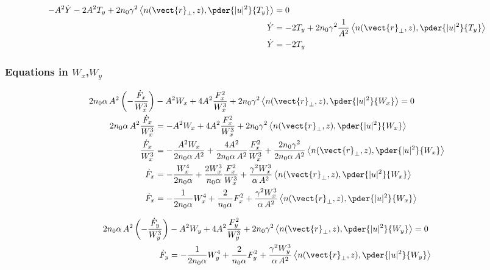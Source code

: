 \begin{equation}
\begin{split}
   -A^2 \dot{Y} - 2A^2 T_y  + 2n_0 \gamma^2 \left<n(\vect{r}_{\perp},z), \pder{|u|^2}{T_{y}}\right> &=0\\
      \dot{Y} &= - 2T_y  + 2n_0 \gamma^2 \frac{1}{A^2} \left<n(\vect{r}_{\perp},z), \pder{|u|^2}{T_{y}}\right>\\
      \dot{Y} &= - 2T_y 
\end{split}
\end{equation}

\subsubsection{Equations in $W_x$,$W_y$}

\begin{equation}
\begin{split}
     2 n_0 \alpha\, A^2 \left(  -\frac{\dot{F}_{x} }{W_{x}^3} \right)  &- A^2 W_x + 4 A^2 \frac{F_{x}^2}{W_{x}^3}  + 2n_0 \gamma^2 \left<n(\vect{r}_{\perp},z), \pder{|u|^2}{W_{x}}\right> = 0 \\
     2 n_0 \alpha\, A^2 \frac{\dot{F}_{x} }{W_{x}^3}  &=   - A^2 W_x + 4 A^2 \frac{F_{x}^2}{W_{x}^3}  + 2n_0 \gamma^2 \left<n(\vect{r}_{\perp},z), \pder{|u|^2}{W_{x}}\right>  \\
     \frac{\dot{F}_{x} }{W_{x}^3}  &=   - \frac{A^2 W_x}{2 n_0 \alpha\, A^2} + \frac{4 A^2 }{2 n_0 \alpha\, A^2} \frac{F_{x}^2}{W_{x}^3}  + \frac{2n_0 \gamma^2}{2 n_0 \alpha\, A^2}  \left<n(\vect{r}_{\perp},z), \pder{|u|^2}{W_{x}}\right> \\
     \dot{F}_{x}  &=   - \frac{W_{x}^4}{2 n_0 \alpha} + \frac{2 W_{x}^3}{n_0 \alpha} \frac{F_{x}^2}{W_{x}^3}  + \frac{\gamma^2 W_{x}^3}{ \alpha\, A^2}  \left<n(\vect{r}_{\perp},z), \pder{|u|^2}{W_{x}}\right> \\ 
     \dot{F}_{x}  &=   - \frac{1}{2 n_0 \alpha} W_{x}^4+ \frac{2}{n_0 \alpha} F_{x}^2  + \frac{\gamma^2 W_{x}^3}{ \alpha\, A^2}  \left<n(\vect{r}_{\perp},z), \pder{|u|^2}{W_{x}}\right> \\    
\end{split}
\end{equation}

\begin{equation}
\begin{split}
    2 n_0 \alpha\, A^2 \left(  -\frac{\dot{F}_{y} }{W_{y}^3} \right) & - A^2 W_y + 4 A^2 \frac{F_{y}^2}{W_{y}^3}  + 2n_0 \gamma^2 \left<n(\vect{r}_{\perp},z), \pder{|u|^2}{W_{y}}\right>= 0 \\
         \dot{F}_{y}  &=   - \frac{1}{2 n_0 \alpha} W_{y}^4 + \frac{2}{n_0 \alpha} F_{y}^2  + \frac{\gamma^2 W_{y}^3}{ \alpha\, A^2}  \left<n(\vect{r}_{\perp},z), \pder{|u|^2}{W_{y}}\right> \\
\end{split}
\end{equation}

